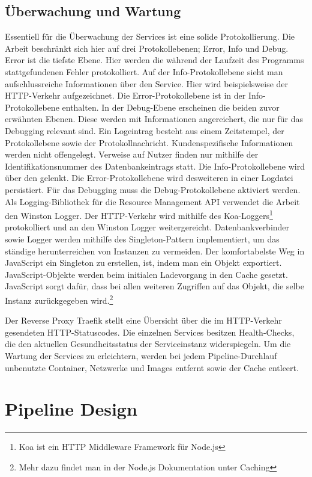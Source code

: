 \subsection{Überwachung und Wartung}
\label{subsec:ueberwachungundwartung}
Essentiell für die Überwachung der Services ist eine solide Protokollierung.
Die Arbeit beschränkt sich hier auf drei Protokollebenen; Error, Info und Debug.
Error ist die tiefste Ebene. Hier werden die während der Laufzeit des Programms
stattgefundenen Fehler protokolliert. Auf der Info-Protokollebene sieht man
aufschlussreiche Informationen über den Service. Hier wird beispielsweise
der HTTP-Verkehr aufgezeichnet. Die Error-Protokollebene ist in der Info-Protokollebene
enthalten. In der Debug-Ebene erscheinen die beiden zuvor erwähnten Ebenen. Diese
werden mit Informationen angereichert, die nur für das Debugging relevant sind.
Ein Logeintrag besteht aus einem Zeitstempel, der Protokollebene sowie der Protokollnachricht.
Kundenspezifische Informationen werden nicht offengelegt. Verweise auf Nutzer finden nur
mithilfe der Identifikationsnummer des Datenbankeintrags statt. Die Info-Protokollebene
wird über den  gelenkt. Die Error-Protokollebene wird desweiteren in einer
Logdatei persistiert. Für das Debugging muss die Debug-Protokollebene aktiviert werden.
Als Logging-Bibliothek für die Resource Management API verwendet die Arbeit den Winston
Logger. Der HTTP-Verkehr wird mithilfe des Koa-Loggers\footnote{Koa ist ein HTTP Middleware Framework für Node.js} protokolliert und an den Winston
Logger weitergereicht. Datenbankverbinder sowie Logger werden mithilfe des Singleton-Pattern
implementiert, um das ständige herunterreichen von Instanzen zu vermeiden. Der komfortabelste
Weg in JavaScript ein Singleton zu erstellen, ist, indem man ein Objekt exportiert. JavaScript-Objekte
werden beim initialen Ladevorgang in den Cache gesetzt. JavaScript sorgt dafür,
dass bei allen weiteren Zugriffen auf das Objekt, die selbe Instanz zurückgegeben wird.\footnote{Mehr dazu findet man in der Node.js Dokumentation unter Caching\cite{NodeJsCaching}}

Der Reverse Proxy Traefik stellt eine Übersicht über die im HTTP-Verkehr gesendeten 
HTTP-Statuscodes. Die einzelnen Services besitzen Health-Checks, die den aktuellen
Gesundheitsstatus der Serviceinstanz widerspiegeln. Um die Wartung der Services zu erleichtern,
werden bei jedem Pipeline-Durchlauf unbenutzte Container, Netzwerke und Images
entfernt sowie der Cache entleert.

\section{Pipeline Design}
\label{sec:pipelinedesign}


